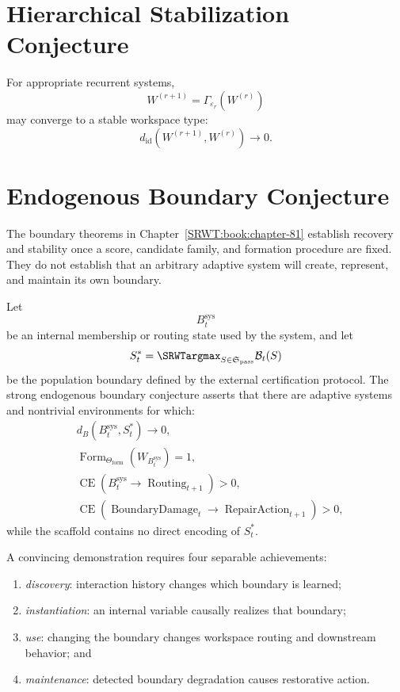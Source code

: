\section{Hierarchical Stabilization Conjecture}

For appropriate recurrent systems,
\[
W^{(r+1)}
=
\Gamma_{\varepsilon_r}(W^{(r)})
\]
may converge to a stable workspace type:
\[
d_{\mathrm{id}}\!\left(
W^{(r+1)},W^{(r)}
\right)
\to0.
\]

\section{Endogenous Boundary Conjecture}

The boundary theorems in Chapter~\ref{SRWT:book:chapter-81} establish recovery and stability once a score,
candidate family, and formation procedure are fixed. They do not establish
that an arbitrary adaptive system will create, represent, and maintain its own
boundary.

Let
\[
B_t^{\mathrm{sys}}
\]
be an internal membership or routing state used by the system, and let
\[
S_t^*
=
\SRWTargmax_{S\in\mathfrak S_{\mathrm{pass}}}
\mathcal B_t(S)
\]
be the population boundary defined by the external certification protocol.
The strong endogenous boundary conjecture asserts that there are adaptive
systems and nontrivial environments for which:
\[
\boxed{
\begin{aligned}
&d_B(B_t^{\mathrm{sys}},S_t^*)\to0,\\
&\operatorname{Form}_{\Theta_{\mathrm{form}}}(W_{B_t^{\mathrm{sys}}})=1,\\
&\operatorname{CE}
\left(
B_t^{\mathrm{sys}}\to
\operatorname{Routing}_{t+1}
\right)>0,\\
&\operatorname{CE}
\left(
\operatorname{BoundaryDamage}_t\to
\operatorname{RepairAction}_{t+1}
\right)>0,
\end{aligned}
}
\]
while the scaffold contains no direct encoding of \(S_t^*\).

A convincing demonstration requires four separable achievements:
\begin{enumerate}
\item \emph{discovery}: interaction history changes which boundary is learned;
\item \emph{instantiation}: an internal variable causally realizes that
 boundary;
\item \emph{use}: changing the boundary changes workspace routing and
 downstream behavior; and
\item \emph{maintenance}: detected boundary degradation causes restorative
 action.
\end{enumerate}

